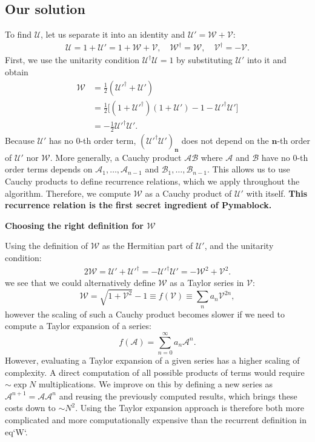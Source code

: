 \subsection{Our solution}

To find $\mathcal{U}$, let us separate it into an identity and $\mathcal{U}' =
\mathcal{W} + \mathcal{V}$:
%
\begin{align}
\label{eq:U}
\mathcal{U} = 1 + \mathcal{U}' = 1 + \mathcal{W} + \mathcal{V},\quad \mathcal{W}^\dagger = \mathcal{W},\quad \mathcal{V}^\dagger = -\mathcal{V}.
\end{align}
%
First, we use the unitarity condition
$\mathcal{U}^\dagger \mathcal{U} = 1$ by substituting $\mathcal{U}'$ into it
and obtain
%
\begin{align}
\label{eq:W}
\mathcal{W} &= \frac{1}{2}(\mathcal{U}'^\dagger + \mathcal{U}') \\
  &= \frac{1}{2} \Big[(1 + \mathcal{U}'^\dagger)(1+\mathcal{U}') - 1 - \mathcal{U}'^\dagger \mathcal{U}' \Big] \\
  &= -\frac{1}{2} \mathcal{U}'^\dagger \mathcal{U}'.
\end{align}
%
Because $\mathcal{U}'$ has no $0$-th order term, $(\mathcal{U}'^\dagger
\mathcal{U}')_\mathbf{n}$ does not depend on the $\mathbf{n}$-th order of
$\mathcal{U}'$ nor $\mathcal{W}$.
More generally, a Cauchy product $\mathcal{A}\mathcal{B}$ where $\mathcal{A}$
and $\mathcal{B}$ have no $0$-th order terms depends on $\mathcal{A}_1, \ldots,
\mathcal{A}_{n-1}$ and $\mathcal{B}_1, \ldots, \mathcal{B}_{n-1}$.
This allows us to use Cauchy products to define recurrence relations, which
we apply throughout the algorithm.
Therefore, we compute $\mathcal{W}$ as a Cauchy product of $\mathcal{U}'$ with
itself.
\textbf{This recurrence relation is the first secret ingredient of Pymablock.}


\textbf{Choosing the right definition for $\mathcal{W}$}

Using the definition of $\mathcal{W}$ as the Hermitian part of $\mathcal{U}'$,
and the unitarity condition:
%
\begin{align}
2\mathcal{W}
= \mathcal{U}' + \mathcal{U}'^\dagger
= -\mathcal{U}'^\dagger \mathcal{U}'
= -\mathcal{W}^2 + \mathcal{V}^2.
\end{align}
%
we see that we could alternatively define $\mathcal{W}$ as a Taylor series in
$\mathcal{V}$:
%
$$
\mathcal{W} = \sqrt{1 + \mathcal{V}^2} - 1 \equiv f(\mathcal{V}) \equiv \sum_n a_n \mathcal{V}^{2n},
$$
%
however the scaling of such a Cauchy product becomes slower if we need to
compute a Taylor expansion of a series:
%
$$
f(\mathcal{A}) = \sum_{n=0}^\infty a_n \mathcal{A}^n.
$$
%
However, evaluating a Taylor expansion of a given series has a higher scaling
of complexity.
A direct computation of all possible products of terms would require $\sim \exp
N$ multiplications.
We improve on this by defining a new series as $\mathcal{A}^{n+1} =
\mathcal{A}\mathcal{A}^{n}$ and reusing the previously computed results, which
brings these costs down to $\sim N^2$.
Using the Taylor expansion approach is therefore both more complicated and more
computationally expensive than the recurrent definition in {eq}`W`.

